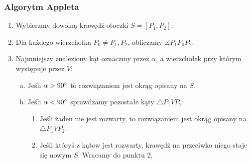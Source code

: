 \documentclass{beamer}
\begin{document}
\begin{frame}

\frametitle{Algorytm Appleta}

\begin{enumerate}[1.]

\item Wybierzmy dowolną krawędź otoczki $S  = [P_1, P_2]$.

\item Dla każdego wierzchołka $P_0 \neq P_1, P_2$, 
obliczamy $ \measuredangle P_1 P_0 P_2 $. 

\item Najmniejszy znaleziony kąt oznaczmy przez $\alpha$, 
a wierzchołek przy którym występuje przez $V$:

\begin{enumerate}[a)]

\item Jeśli $ \alpha > 90 \degree $ to rozwiązaniem jest okrąg opisany na $S$. 
\item  Jeśli $ \alpha < 90 \degree $ sprawdzamy pozostałe 
kąty $ \triangle P_1 V P_2 $:

\begin{enumerate}[-]
\item  Jeśli żaden nie jest rozwarty, to rozwiązaniem 
jest okrąg opisany na $ \triangle P_1 V P_2 $.

\item Jeśli któryś z kątow jest rozwarty, krawędź na przeciwko niego 
staje się nowym $S$. Wracamy do punktu 2.

\end{enumerate}

\end{enumerate}

\end{enumerate}

\end{frame}


\end{document}
